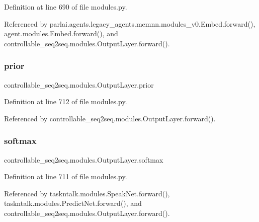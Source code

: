 Definition at line 690 of file modules.\+py.



Referenced by parlai.\+agents.\+legacy\+\_\+agents.\+memnn.\+modules\+\_\+v0.\+Embed.\+forward(), agent.\+modules.\+Embed.\+forward(), and controllable\+\_\+seq2seq.\+modules.\+Output\+Layer.\+forward().

\mbox{\label{classcontrollable__seq2seq_1_1modules_1_1OutputLayer_a4a9c4567d549b1904d49f3fb135ea11c}} 
\subsubsection{\texorpdfstring{prior}{prior}}
{\footnotesize\ttfamily controllable\+\_\+seq2seq.\+modules.\+Output\+Layer.\+prior}



Definition at line 712 of file modules.\+py.



Referenced by controllable\+\_\+seq2seq.\+modules.\+Output\+Layer.\+forward().

\mbox{\label{classcontrollable__seq2seq_1_1modules_1_1OutputLayer_a1129f33e8fbbffdd2898f2823c077f2b}} 
\subsubsection{\texorpdfstring{softmax}{softmax}}
{\footnotesize\ttfamily controllable\+\_\+seq2seq.\+modules.\+Output\+Layer.\+softmax}



Definition at line 711 of file modules.\+py.



Referenced by taskntalk.\+modules.\+Speak\+Net.\+forward(), taskntalk.\+modules.\+Predict\+Net.\+forward(), and controllable\+\_\+seq2seq.\+modules.\+Output\+Layer.\+forward().

